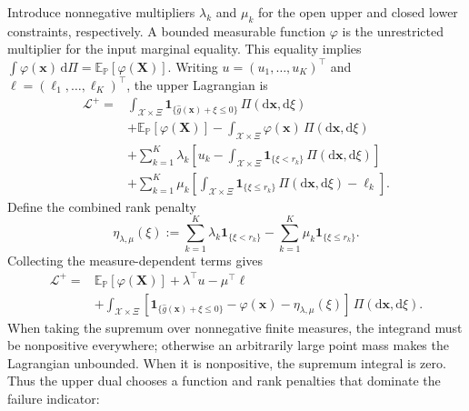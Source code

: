 \documentclass[review,11pt,3p,authoryear,nopreprintline]{elsarticle}
\begin{document}
Introduce nonnegative multipliers $\lambda_k$ and $\mu_k$ for the open upper and closed lower constraints, respectively. A bounded measurable function $\varphi$ is the unrestricted multiplier for the input marginal equality. This equality implies
$\int\varphi(\bm x)\,\mathrm d\Pi=\mathbb E_{\mathbb P}[\varphi(\bm X)]$.
Writing $u=(u_1,\ldots,u_K)^\top$ and $\ell=(\ell_1,\ldots,\ell_K)^\top$, the upper Lagrangian is \citep[Section~5.1]{B.V04}
\begin{equation}
  \begin{aligned}
    \mathcal L^+={}&
    \int_{\mathcal X\times\Xi}\mathbf1_{\{\hat g(\bm x)+\xi\le0\}}\,\Pi\left(\mathrm d\bm x,\mathrm d\xi\right)\\
    &+\mathbb E_{\mathbb P}\left[\varphi(\bm X)\right]
    -\int_{\mathcal X\times\Xi}\varphi(\bm x)\,\Pi\left(\mathrm d\bm x,\mathrm d\xi\right)\\
    &+\sum_{k=1}^K\lambda_k\left[u_k-\int_{\mathcal X\times\Xi}\mathbf1_{\{\xi<r_k\}}\,\Pi\left(\mathrm d\bm x,\mathrm d\xi\right)\right]\\
    &+\sum_{k=1}^K\mu_k\left[\int_{\mathcal X\times\Xi}\mathbf1_{\{\xi\le r_k\}}\,\Pi\left(\mathrm d\bm x,\mathrm d\xi\right)-\ell_k\right].
  \end{aligned}
  \label{eq-upper-lagrangian}
\end{equation}
Define the combined rank penalty
\begin{equation}
  \eta_{\lambda,\mu}(\xi):=
  \sum_{k=1}^K\lambda_k\mathbf1_{\{\xi<r_k\}}
  -\sum_{k=1}^K\mu_k\mathbf1_{\{\xi\le r_k\}}.
  \label{eq-dual-step-function}
\end{equation}
Collecting the measure-dependent terms gives
\begin{equation}
  \begin{aligned}
    \mathcal L^+={}&\mathbb E_{\mathbb P}\left[\varphi(\bm X)\right]+\lambda^\top u-\mu^\top\ell\\
    &+\int_{\mathcal X\times\Xi}\left[\mathbf1_{\{\hat g(\bm x)+\xi\le0\}}-\varphi(\bm x)-\eta_{\lambda,\mu}(\xi)\right]\,\Pi\left(\mathrm d\bm x,\mathrm d\xi\right).
  \end{aligned}
  \label{eq-collected-upper-lagrangian}
\end{equation}
When taking the supremum over nonnegative finite measures, the integrand must be nonpositive everywhere; otherwise an arbitrarily large point mass makes the Lagrangian unbounded. When it is nonpositive, the supremum integral is zero. Thus the upper dual chooses a function and rank penalties that dominate the failure indicator:
\end{document}
